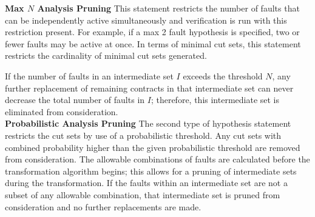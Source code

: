 \textbf{Max $N$ Analysis Pruning} This statement restricts the number of faults that can be independently active simultaneously and verification is run with this restriction present. For example, if a max 2 fault hypothesis is specified, two or fewer faults may be active at once. In terms of minimal cut sets, this statement restricts the cardinality of minimal cut sets generated.

If the number of faults in an intermediate set $I$ exceeds the threshold $N$, any further replacement of remaining contracts in that intermediate set can never decrease the total number of faults in $I$; therefore, this intermediate set is eliminated from consideration.\\

\textbf{Probabilistic Analysis Pruning} The second type of hypothesis statement restricts the cut sets by use of a probabilistic threshold. Any cut sets with combined probability higher than the given probabilistic threshold are removed from consideration. The allowable combinations of faults are calculated before the transformation algorithm begins; this allows for a pruning of intermediate sets during the transformation. If the faults within an intermediate set are not a subset of any allowable combination, that intermediate set is pruned from consideration and no further replacements are made. 
